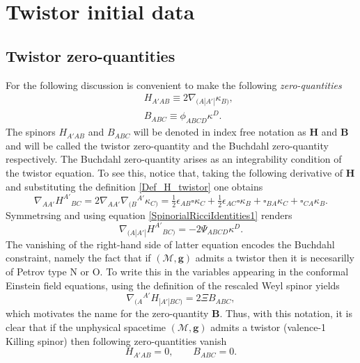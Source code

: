 \documentclass[10pt,a4paper]{article}
\theoremstyle{plain}
\def\bmg{{\bm g}}
\def\bmB{{\bm B}}
\def\bmH{{\bm H}}
\begin{document}
{\color{blue}
\section{Twistor initial data}

\subsection{Twistor zero-quantities}
\label{Sec:TwistorZeroQuantities}

For the following discussion is convenient to make the following
\emph{zero-quantities}
\begin{subequations}
  \begin{eqnarray}
   && H_{A'AB} \equiv 2
    \nabla_{(A|A'|}\kappa_{B)},\label{Def_H_twistor}\\ && B_{ABC}
    \equiv \phi_{ABCD}\kappa^D.\label{Def_B_twistor}
    \end{eqnarray}
\end{subequations}
The spinors $H_{A'AB}$ and $B_{ABC}$ will be denoted in index free
notation as $\bmH$ and $\bmB$ and will be called the twistor
zero-quantity and the Buchdahl zero-quantity respectively.  The
Buchdahl zero-quantity arises as an integrability condition of the
twistor equation.  To see this, notice that, taking the following
derivative of $\bmH$ and substituting the definition
\eqref{Def_H_twistor} one obtains
  \begin{equation}\label{curl_H_twistor}
  \nabla_{AA'}H^{A'}{}_{BC}= 2 \nabla_{AA'}\nabla_{(B}{}^{A'}\kappa
  _{C)} = \tfrac{1}{2} \epsilon _{AB} \square \kappa _{C}  +
  \tfrac{1}{2}  \epsilon _{AC} \square \kappa _{B} +
  \square_{BA}\kappa _{C} + \square_{CA}\kappa _{B}.
  \end{equation}
  Symmetrsing and using equation \eqref{SpinorialRicciIdentities1} renders
  \[
  \nabla_{(A|A'|}H^{A'}{}_{BC)}= - 2\Psi_{ABCD}\kappa^D.
  \]
  The vanishing of the right-hand side of latter equation encodes the
  Buchdahl constraint, namely the fact that if $(\mathcal{M},\bmg)$
  admits a twistor then it is necesarilly of Petrov type N or O. To write this in the variables appearing in the  conformal Einstein field equations, using the definition of the
  rescaled Weyl spinor yields
  \begin{equation}\label{Curl_H_sym_toB_twistor}
  \nabla_{(A}{}^{A'}H_{|A'|BC)} = 2\Xi B_{ABC},
  \end{equation}
  which motivates the name for the zero-quantity $\bmB$.
  Thus, with this notation, it is clear that if the unphysical spacetime
  $(\mathcal{M},\bmg)$ admits a twistor (valence-1 Killing spinor) then following
  zero-quantities vanish
  \begin{equation}
H_{A'AB}=0, \qquad B_{ABC}=0.
  \end{equation}
}
\end{document}
